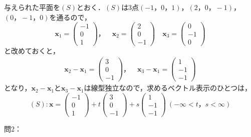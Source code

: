 \documentclass[dvipdfmx,uplatex,11pt]{jsarticle}
\theoremstyle{definition}
\begin{document}
\begin{leftbar}
    与えられた平面を$(S)$とおく．$(S)$は3点$(-1，0，1)$，$(2，0，-1)$，$(0，-1，0)$を通るので，
    \[
   \bm{x}_1=\left(
        \begin{array}{c}
            -1 \\
            0 \\
            1
        \end{array}
   \right)
   ，\quad \bm{x}_2=\left(
    \begin{array}{c}
        2 \\
        0 \\
        -1
    \end{array}
\right) \quad 
\bm{x}_3=\left(
    \begin{array}{c}
        0 \\
        -1 \\
        0
    \end{array}
\right)
\]
と改めておくと，
\begin{gather*}
    \bm{x}_2 - \bm{x}_1 =
    \left(
        \begin{array}{c}
            3 \\
            0 \\
            -1
        \end{array}
    \right)
    ，\quad 
    \bm{x}_3 - \bm{x}_1 =
    \left(
    \begin{array}{c}
        1 \\
        -1 \\
        -1
    \end{array}
    \right)
\end{gather*}
となり，$\bm{x}_2 - \bm{x}_1$と$\bm{x}_3 - \bm{x}_1$は線型独立なので，求めるベクトル表示のひとつは，
\[
    (S) \colon \bm{x}=\left(
        \begin{array}{c}
            -1 \\
            0 \\
            1
        \end{array}
    \right)+ t 
    \left(
        \begin{array}{c}
            3 \\
            0 \\
            -1
        \end{array}
    \right)+s
    \left(
        \begin{array}{c}
            1 \\
            -1 \\
            -1
        \end{array}
        \right)~( -\infty < t，s<\infty)
        \]
    \end{leftbar}
%
%
%
%
問2：
\end{document}
